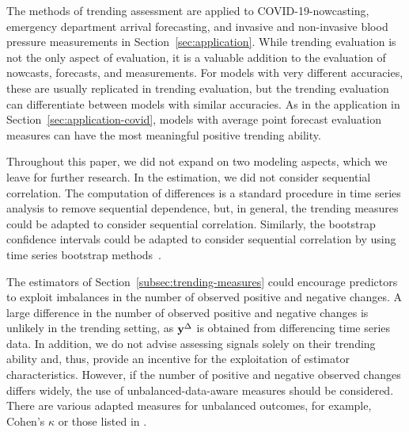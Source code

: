 The methods of trending assessment are applied to COVID-19-nowcasting, emergency department arrival forecasting, and invasive and non-invasive blood pressure measurements in Section~\ref{sec:application}.
While trending evaluation is not the only aspect of evaluation, it is a valuable addition to the evaluation of nowcasts, forecasts, and measurements.
For models with very different accuracies, these are usually replicated in trending evaluation, but the trending evaluation can differentiate between models with similar accuracies.
As in the application in Section~\ref{sec:application-covid}, models with average point forecast evaluation measures can have the most meaningful positive trending ability.

Throughout this paper, we did not expand on two modeling aspects, which we leave for further research.
In the estimation, we did not consider sequential correlation.
The computation of differences is a standard procedure in time series analysis to remove sequential dependence, but, in general, the trending measures could be adapted to consider sequential correlation.
Similarly, the bootstrap confidence intervals could be adapted to consider sequential correlation by using time series bootstrap methods~\parencite{Hardle2003,Kreiss2012}.

The estimators of Section~\ref{subsec:trending-measures} could encourage predictors to exploit imbalances in the number of observed positive and negative changes.
A large difference in the number of observed positive and negative changes is unlikely in the trending setting, as $\mathbf{y}^{\Delta}$ is obtained from differencing time series data.
In addition, we do not advise assessing signals solely on their trending ability and, thus, provide an incentive for the exploitation of estimator characteristics.
However, if the number of positive and negative observed changes differs widely, the use of unbalanced-data-aware measures should be considered.
There are various adapted measures for unbalanced outcomes, for example, Cohen's $\kappa$ \parencite{Cohen1960} or those listed in \textcite[Table 3.3]{Jolliffe2012}.
